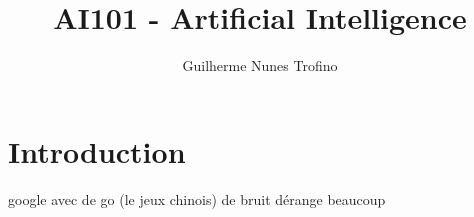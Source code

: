 \documentclass{article}
\title{AI101 - Artificial Intelligence}
\author{Guilherme Nunes Trofino}
\begin{document}
\maketitle

\newpage\tableofcontents

\section{Introduction}
google avec de go (le jeux chinois)
de bruit dérange beaucoup
\end{document}
